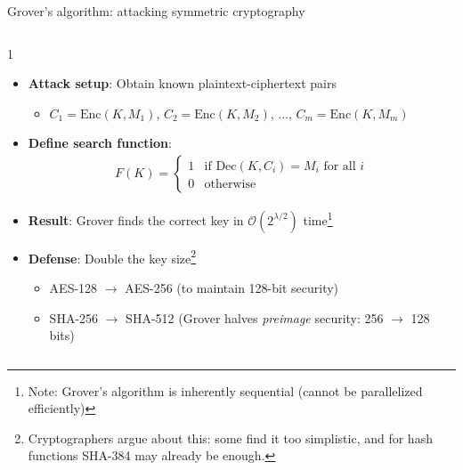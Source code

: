 \ifdefined\PRESENTATION\else\PassOptionsToClass{handout}{beamer}\fi\documentclass[aspectratio=169, lualatex]{beamer}
\begin{document}
\begin{frame}{Grover's algorithm: attacking symmetric cryptography}
	\begin{columns}[c]
		\begin{column}{1\textwidth}
			\begin{itemize}
				\item \textbf{Attack setup}: Obtain known plaintext-ciphertext pairs
				      \begin{itemize}
					      \item $C_1 = \text{Enc}(K, M_1)$, $C_2 = \text{Enc}(K, M_2)$, ..., $C_m = \text{Enc}(K, M_m)$
				      \end{itemize}
				\item \textbf{Define search function}:
				      \begin{align*}
					      F(K) = \begin{cases}
						             1 & \text{if } \text{Dec}(K, C_i) = M_i \text{ for all } i \\
						             0 & \text{otherwise}
					             \end{cases}
				      \end{align*}
				\item \textbf{Result}: Grover finds the correct key in $\mathcal{O}(2^{\lambda/2})$ time\footnote{Note: Grover's algorithm is inherently sequential (cannot be parallelized efficiently)}
				\item \textbf{Defense}: Double the key size\footnote{Cryptographers argue about this: some find it too simplistic, and for hash functions SHA-384 may already be enough.}
				      \begin{itemize}
					      \item AES-128 $\rightarrow$ AES-256 (to maintain 128-bit security)
					      \item SHA-256 $\rightarrow$ SHA-512 (Grover halves \textit{preimage} security: 256 $\rightarrow$ 128 bits)
				      \end{itemize}
			\end{itemize}
		\end{column}
	\end{columns}
\end{frame}
\end{document}
